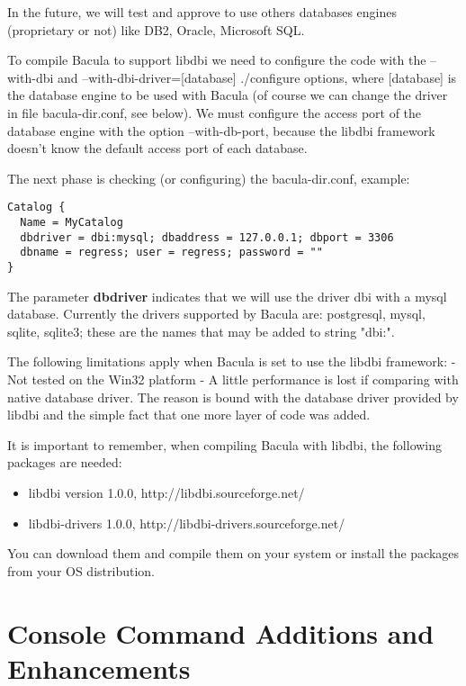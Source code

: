  In the future, we will test and approve to use others databases engines
 (proprietary or not) like DB2, Oracle, Microsoft SQL.

 To compile Bacula to support libdbi we need to configure the code with the
 --with-dbi and --with-dbi-driver=[database] ./configure options, where
 [database] is the database engine to be used with Bacula (of course we can
 change the driver in file bacula-dir.conf, see below).  We must configure the
 access port of the database engine with the option --with-db-port, because the
 libdbi framework doesn't know the default access port of each database.

The next phase is checking (or configuring) the bacula-dir.conf, example:
\begin{verbatim}
Catalog {
  Name = MyCatalog
  dbdriver = dbi:mysql; dbaddress = 127.0.0.1; dbport = 3306
  dbname = regress; user = regress; password = ""
}
\end{verbatim}

The parameter {\bf dbdriver} indicates that we will use the driver dbi with a
mysql database.  Currently the drivers supported by Bacula are: postgresql,
mysql, sqlite, sqlite3; these are the names that may be added to string "dbi:".

The following limitations apply when Bacula is set to use the libdbi framework:
 - Not tested on the Win32 platform
 - A little performance is lost if comparing with native database driver. 
   The reason is bound with the database driver provided by libdbi and the 
   simple fact that one more layer of code was added.

It is important to remember, when compiling Bacula with libdbi, the
following packages are needed:
 \begin{itemize}
  \item libdbi version 1.0.0, http://libdbi.sourceforge.net/
  \item libdbi-drivers 1.0.0, http://libdbi-drivers.sourceforge.net/
 \end{itemize}
 
 You can download them and compile them on your system or install the packages
 from your OS distribution.

\section{Console Command Additions and Enhancements}

